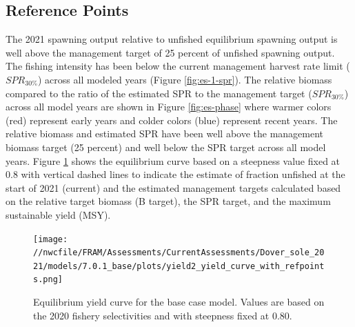 \documentclass[11pt,
  english,
  a4paper,
]{article}
\begin{document}
\leavevmode\tagmcend\tagstructend\par


\hypertarget{reference-points}{%
\subsection*{Reference Points}\label{reference-points}}

\leavevmode\tagmcend\tagstructend


The 2021 spawning output relative to unfished equilibrium spawning output is well above the management target of 25 percent of unfished spawning output. The fishing intensity has been below the current management harvest rate limit ({\(SPR_{30\%}\)\leavevmode\tagmcend\tagstructend}) across all modeled years (Figure \ref{fig:es-1-spr}). The relative biomass compared to the ratio of the estimated SPR to the management target ({\(SPR_{30\%}\)\leavevmode\tagmcend\tagstructend}) across all model years are shown in Figure \ref{fig:es-phase} where warmer colors (red) represent early years and colder colors (blue) represent recent years. The relative biomass and estimated SPR have been well above the management biomass target (25 percent) and well below the SPR target across all model years. Figure \ref{fig:es-yield} shows the equilibrium curve based on a steepness value fixed at 0.8 with vertical dashed lines to indicate the estimate of fraction unfished at the start of 2021 (current) and the estimated management targets calculated based on the relative target biomass (B target), the SPR target, and the maximum sustainable yield (MSY).

\leavevmode\tagmcend\tagstructend\par


\begin{figure}
\centering
\texttt{[image: //nwcfile/FRAM/Assessments/CurrentAssessments/Dover\_sole\_2021/models/7.0.1\_base/plots/yield2\_yield\_curve\_with\_refpoints.png]}
\caption{Equilibrium yield curve for the base case model. Values are based on the 2020 fishery selectivities and with steepness fixed at 0.80.\label{fig:es-yield}}
\end{figure}
\end{document}
